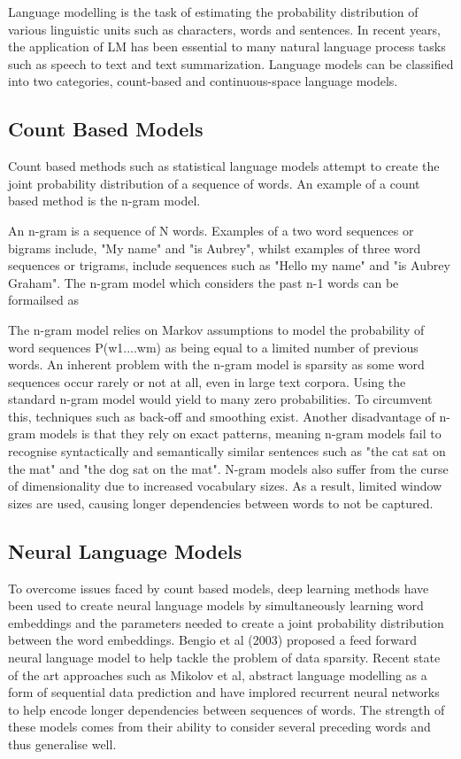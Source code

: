 \noindent
\newline
Language modelling is the task of estimating the probability distribution of various linguistic units such as characters, words and sentences. In recent years, the application of LM  has been essential to many natural language process tasks such as speech to text and text summarization. Language models can be classified into two categories, count-based and continuous-space language models. 

\subsection{Count Based Models}
Count based methods such as statistical language models attempt to create the joint probability distribution of a sequence of words. An example of a count based method is the n-gram model.

\noindent
\newline
An n-gram is a sequence of N words. Examples of a two word sequences or bigrams include, "My name" and "is Aubrey", whilst examples of three word sequences or trigrams, include sequences such as "Hello my name" and "is Aubrey Graham". The n-gram model which considers the past n-1 words can be formailsed as 

\noindent
\newline
The n-gram model relies on Markov assumptions to model the probability of word sequences P(w1....wm) as being equal to a limited number of previous words. An inherent problem with the n-gram model is sparsity as some word sequences occur rarely or not at all, even in large text corpora. Using the standard n-gram model would yield to many zero probabilities. To circumvent this, techniques such as back-off and smoothing exist. Another disadvantage of n-gram models is that they rely on exact patterns, meaning n-gram models fail to recognise syntactically and semantically similar sentences such as "the cat sat on the mat" and "the dog sat on the mat". N-gram models also suffer from the curse of dimensionality due to increased vocabulary sizes. As a result, limited window sizes are used, causing longer dependencies between words to not be captured.

\subsection{Neural Language Models}
To overcome issues faced by count based models, deep learning methods have been used to create neural language models by simultaneously learning word embeddings and the parameters needed to create a joint probability distribution between the word embeddings. Bengio et al (2003) proposed a feed forward neural language model to help tackle the problem of data sparsity. Recent state of the art approaches such as Mikolov et al, abstract language modelling as a form of sequential data prediction and have implored recurrent neural networks to help encode longer dependencies between sequences of words. The strength of these models comes from their ability to consider several preceding words and thus generalise well.

